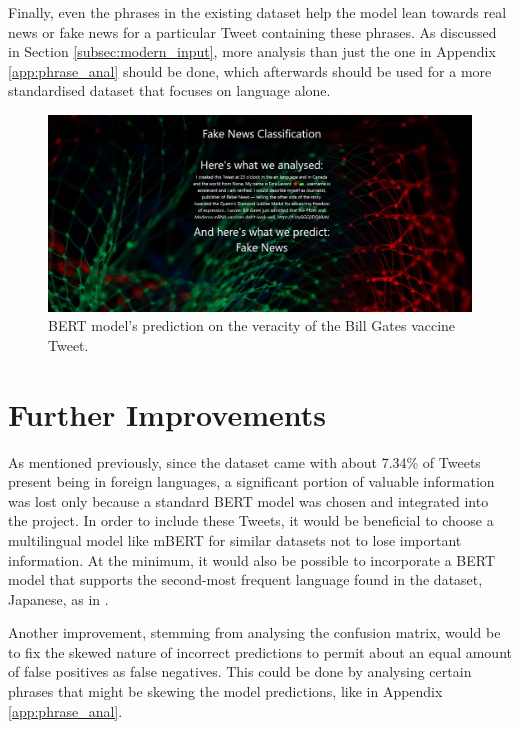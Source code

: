 \documentclass{l4proj}
\begin{document}
Finally, even the phrases in the existing dataset help the model lean towards real news or fake news for a particular Tweet containing these phrases. As discussed in Section \ref{subsec:modern_input}, more analysis than just the one in Appendix \ref{app:phrase_anal} should be done, which afterwards should be used for a more standardised dataset that focuses on language alone.

\begin{figure}
    \centering
    \includegraphics[width=1\linewidth]{images/web/new.png}    

    \caption{BERT model's prediction on the veracity of the Bill Gates vaccine Tweet.}
    \label{fig:new_tweet} 
\end{figure}

\section{Further Improvements}
\label{sec:improvements}

As mentioned previously, since the dataset came with about 7.34\% of Tweets present being in foreign languages, a significant portion of valuable information was lost only because a standard BERT model was chosen and integrated into the project. In order to include these Tweets, it would be beneficial to choose a multilingual model like mBERT for similar datasets not to lose important information. At the minimum, it would also be possible to incorporate a BERT model that supports the second-most frequent language found in the dataset, Japanese, as in \citet{BERTJapanese}.

Another improvement, stemming from analysing the confusion matrix, would be to fix the skewed nature of incorrect predictions to permit about an equal amount of false positives as false negatives. This could be done by analysing certain phrases that might be skewing the model predictions, like in Appendix \ref{app:phrase_anal}.
\end{document}
